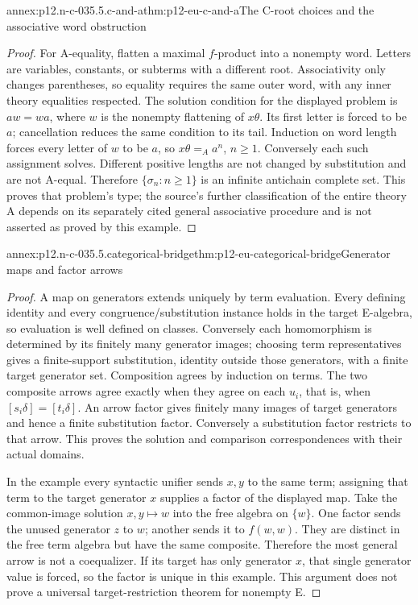 \begin{annexitem}{annex:p12.n-c-035.5.c-and-a}{thm:p12-eu-c-and-a}{The C-root choices and the associative word obstruction}
\begin{proof}
For A-equality, flatten a maximal \(f\)-product into a nonempty
word. Letters are variables, constants, or subterms with a different
root. Associativity only changes parentheses, so equality requires
the same outer word, with any inner theory equalities respected.
The solution condition for the displayed problem is \(aw=wa\),
where \(w\) is the nonempty flattening of \(x\theta\).
Its first letter is forced to be \(a\); cancellation reduces the
same condition to its tail. Induction on word length forces every
letter of \(w\) to be \(a\), so \(x\theta=_A a^n\), \(n\geq1\).
Conversely each such assignment solves. Different positive lengths
are not changed by substitution and are not A-equal. Therefore
\(\{\sigma_n:n\geq1\}\) is an infinite antichain complete set.
This proves that problem's type; the source's further classification
of the entire theory A depends on its separately cited general
associative procedure and is not asserted as proved by this example.
\end{proof}
\end{annexitem}

\begin{annexitem}{annex:p12.n-c-035.5.categorical-bridge}{thm:p12-eu-categorical-bridge}{Generator maps and factor arrows}
\begin{proof}
A map on generators extends uniquely by term evaluation. Every defining
identity and every congruence/substitution instance holds in the target
E-algebra, so evaluation is well defined on classes. Conversely each
homomorphism is determined by its finitely many generator images;
choosing term representatives gives a finite-support substitution,
identity outside those generators, with a finite target generator set.
Composition agrees by induction on terms. The two composite arrows
agree exactly when they agree on each \(u_i\), that is, when
\([s_i\delta]=[t_i\delta]\). An arrow factor gives finitely many
images of target generators and hence a finite substitution factor.
Conversely a substitution factor restricts to that arrow. This proves
the solution and comparison correspondences with their actual domains.

In the example every syntactic unifier sends \(x,y\) to the same
term; assigning that term to the target generator \(x\) supplies a
factor of the displayed map. Take the common-image solution \(x,y\mapsto w\)
into the free algebra on \(\{w\}\). One factor sends the unused
generator \(z\) to \(w\); another sends it to \(f(w,w)\).
They are distinct in the free term algebra but have the same composite.
Therefore the most general arrow is not a coequalizer. If its target
has only generator \(x\), that single generator value is forced,
so the factor is unique in this example. This argument does not prove
a universal target-restriction theorem for nonempty E.
\end{proof}
\end{annexitem}

